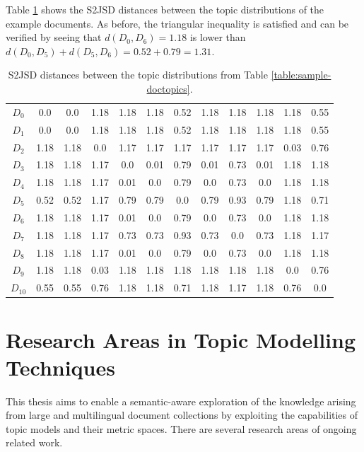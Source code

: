 Table \ref{table:s2jsd-distances} shows the S2JSD distances between the topic distributions of the example documents. As before, the triangular inequality is satisfied and can be verified by seeing that $d(D_0,D_6)=1.18$ is lower than $d(D_0,D_5)+d(D_5,D_6)=0.52+0.79=1.31$. 


\begin{table}[!htbp]
\centering%
\small
\begin{tabularx}{\linewidth}{CCCCCCCCCCCC}
\toprule
\heading{} &  &  &  &  &  &  &  &  &  &  &  \\
\midrule
\midrule
$D_0$&0.0&0.0&1.18&1.18&1.18&0.52&1.18&1.18&1.18&1.18&0.55\\
\midrule
$D_1$&0.0&0.0&1.18&1.18&1.18&0.52&1.18&1.18&1.18&1.18&0.55\\
\midrule
$D_2$&1.18&1.18&0.0&1.17&1.17&1.17&1.17&1.17&1.17&0.03&0.76\\
\midrule
$D_3$&1.18&1.18&1.17&0.0&0.01&0.79&0.01&0.73&0.01&1.18&1.18\\
\midrule
$D_4$&1.18&1.18&1.17&0.01&0.0&0.79&0.0&0.73&0.0&1.18&1.18\\
\midrule
$D_5$&0.52&0.52&1.17&0.79&0.79&0.0&0.79&0.93&0.79&1.18&0.71\\
\midrule
$D_6$&1.18&1.18&1.17&0.01&0.0&0.79&0.0&0.73&0.0&1.18&1.18\\
\midrule
$D_7$&1.18&1.18&1.17&0.73&0.73&0.93&0.73&0.0&0.73&1.18&1.17\\
\midrule
$D_8$&1.18&1.18&1.17&0.01&0.0&0.79&0.0&0.73&0.0&1.18&1.18\\
\midrule
$D_9$&1.18&1.18&0.03&1.18&1.18&1.18&1.18&1.18&1.18&0.0&0.76\\
\midrule
$D_{10}$&0.55&0.55&0.76&1.18&1.18&0.71&1.18&1.17&1.18&0.76&0.0\\
\midrule
\bottomrule
\end{tabularx}
\caption{S2JSD distances between the topic distributions from Table \ref{table:sample-doctopics}.}
\label{table:s2jsd-distances}
\end{table}


\section{Research Areas in Topic Modelling Techniques}
\label{sec:research-topic}

This thesis aims to enable a semantic-aware exploration of the knowledge arising from large and multilingual document collections by exploiting the capabilities of topic models and their metric spaces. There are several research areas of ongoing related work. 

